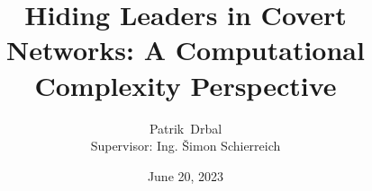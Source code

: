 \documentclass[aspectratio=169,compress]{beamer}
\title[Short Paper Title] %
{Hiding Leaders in Covert Networks:\linebreak
A Computational Complexity Perspective}
\author[Author, Another] %
{Patrik~Drbal\\[\baselineskip]Supervisor: Ing. Šimon Schierreich\\[\baselineskip]}
\date[Short Occasion] %
{June 20, 2023}
\newcommand{\HL}{\textsc{Hiding Leaders}\xspace}
\begin{document}
\begin{frame}
  \titlepage
\end{frame}





\appendix









\end{document}
